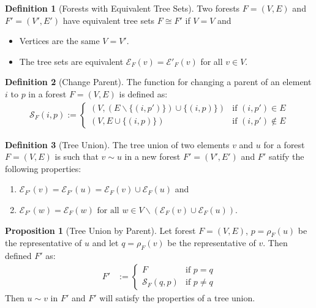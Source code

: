 \documentclass[a4paper,12pt]{article}
\theoremstyle{definition}
\newtheorem{definition}{Definition}[section]
\newtheorem{proposition}{Proposition}[section]
\begin{document}
\begin{definition}[Forests with Equivalent Tree Sets]
    Two forests $F = (V, E)$ and $F' = (V', E')$ have equivalent tree sets $F
    \cong F'$ if $V = V$ and
    \begin{itemize}
        \item Vertices are the same $V = V'$.
        \item The tree sets are equivalent $\mathcal{E}_{F}(v) =
        \mathcal{E'}_F(v)$ for all $v \in V$.
    \end{itemize}
\end{definition}

\begin{definition}[Change Parent]
    The function for changing a parent of an element $i$ to $p$ in a forest
    $F = (V, E)$ is defined as:
    \begin{align*}
        \mathcal{S}_F(i, p) := \begin{cases}
            (V, (E \backslash \{(i, p')\}) \cup \{(i, p)\}) & \text{if } (i, p') \in E \\
            (V, E \cup \{(i, p)\}) & \text{if } (i, p') \notin E
        \end{cases}
    \end{align*}
\end{definition}

\begin{definition}[Tree Union]
    The tree union of two elements $v$ and $u$ for a forest $F = (V, E)$ is such
    that $v \sim u$ in a new forest $F' = (V', E')$ and $F'$ satify the
    following properties:
    \begin{enumerate}
        \item $\mathcal{E}_{F'}(v) = \mathcal{E}_{F'}(u) = \mathcal{E}_F(v) \cup \mathcal{E}_F(u)$ and
        \item $\mathcal{E}_{F'}(w) = \mathcal{E}_F(w) \text{ for all } w \in V
        \backslash (\mathcal{E}_F(v) \cup \mathcal{E}_F(u))$.
    \end{enumerate}
\end{definition}

\begin{proposition}[Tree Union by Parent]\label{def:sequential-unions}
    Let forest $F = (V, E)$, $p = \rho_F(u)$ be the representative of $u$ and
    let $q = \rho_F(v)$ be the representative of $v$. Then defined $F'$ as:
    \begin{align*}
        F' &:= \begin{cases}
            F & \text{if } p = q \\
            \mathcal{S}_{F}(q, p) & \text{if } p \neq q
        \end{cases}
    \end{align*}
    Then $u \sim v$ in $F'$ and $F'$ will satisfy the properties of a tree
    union.
\end{proposition}
\end{document}
